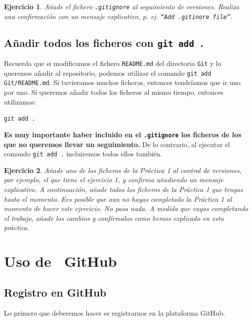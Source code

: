 \documentclass[11pt,a4paper]{article}
\newcommand{\GitHub}{\faIcon{github}~\!GitHub}
\theoremstyle{exercise}
\newtheorem{exercise}{Ejercicio}
\begin{document}
\begin{exercise} Añade el fichero \texttt{.gitignore} al seguimiento de versiones. Realiza una confirmación con un mensaje explicativo, p. ej. \texttt{``Add .gitinore file''}.
\end{exercise}

\subsection{Añadir todos los ficheros con \texttt{git add .}}

Recuerda que si modificamos el fichero \texttt{README.md} del directorio \texttt{Git} y lo queremos añadir al repositorio, podemos utilizar el comando \texttt{git add Git/README.md}. Si tuvieramos muchos ficheros, entonces tendríamos que ir uno por uno. Si queremos añadir todos los ficheros al mismo tiempo, entonces utilizamos:
\begin{center}
\texttt{git add .}
\end{center}
\textbf{Es muy importante haber incluido en el \texttt{.gitignore} los ficheros de los que no queremos llevar un seguimiento.} De lo contrario, al ejecutar el comando \texttt{git add .} incluiremos todos ellos también.

\begin{exercise} Añade uno de los ficheros de la Práctica 1 al control de versiones, por ejemplo, el que tiene el ejercicio 1, y confirma añadiendo un mensaje explicativo. A continuación, añade todos los ficheros de la Práctica 1 que tengas hasta el momento. Ees posible que aun no hayas completado la Práctica 1 al momento de hacer este ejercicio. No pasa nada. A medida que vayas completando el trabajo, añade los cambios y confírmalos como hemos explicado en esta práctica.
\end{exercise}







\section[Uso de GitHub]{Uso de \GitHub}

\subsection{Registro en GitHub}

Lo primero que deberemos hacer es registrarnos en la plataforma GitHub.
\end{document}

